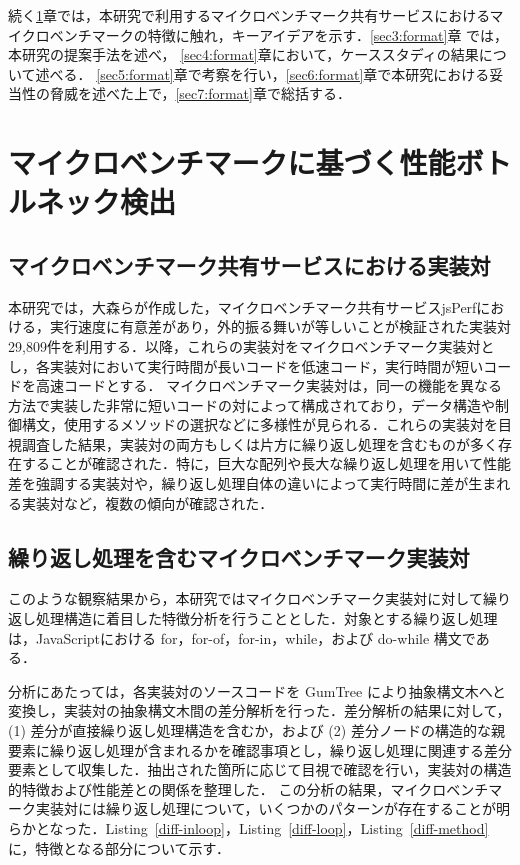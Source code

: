 \documentclass[submit,techrep,noauthor]{ipsj}
\newcommand{\todo}[1]{\colorbox{yellow}{{\bf TODO}:}{\color{red} {\textbf{[#1]}}}}
\begin{document}
続く\ref{sec2:format}章では，本研究で利用するマイクロベンチマーク共有サービスにおけるマイクロベンチマークの特徴に触れ，キーアイデアを示す．\ref{sec3:format}章 では，本研究の提案手法を述べ， \ref{sec4:format}章において，ケーススタディの結果について述べる． \ref{sec5:format}章で考察を行い，\ref{sec6:format}章で本研究における妥当性の脅威を述べた上で，\ref{sec7:format}章で総括する． 


\section{マイクロベンチマークに基づく性能ボトルネック検出}
\label{sec2:format}


\subsection{マイクロベンチマーク共有サービスにおける実装対}

本研究では，大森ら\cite{omori}が作成した，マイクロベンチマーク共有サービスjsPerfにおける，実行速度に有意差があり，外的振る舞いが等しいことが検証された実装対29,809件を利用する．以降，これらの実装対をマイクロベンチマーク実装対とし，各実装対において実行時間が長いコードを低速コード，実行時間が短いコードを高速コードとする．
マイクロベンチマーク実装対は，同一の機能を異なる方法で実装した非常に短いコードの対によって構成されており，データ構造や制御構文，使用するメソッドの選択などに多様性が見られる．これらの実装対を目視調査した結果，実装対の両方もしくは片方に繰り返し処理を含むものが多く存在することが確認された．特に，巨大な配列や長大な繰り返し処理を用いて性能差を強調する実装対や，繰り返し処理自体の違いによって実行時間に差が生まれる実装対など，複数の傾向が確認された．


\subsection{繰り返し処理を含むマイクロベンチマーク実装対}
\label{section2.2}

このような観察結果から，本研究ではマイクロベンチマーク実装対に対して繰り返し処理構造に着目した特徴分析を行うこととした．対象とする繰り返し処理は，JavaScriptにおける for，for-of，for-in，while，および do-while 構文である．


分析にあたっては，各実装対のソースコードを GumTree \cite{gumtree}により抽象構文木へと変換し，実装対の抽象構文木間の差分解析を行った．差分解析の結果に対して，(1) 差分が直接繰り返し処理構造を含むか，および (2) 差分ノードの構造的な親要素に繰り返し処理が含まれるかを確認事項とし，繰り返し処理に関連する差分要素として収集した．抽出された箇所に応じて目視で確認を行い，実装対の構造的特徴および性能差との関係を整理した．
この分析の結果，マイクロベンチマーク実装対には繰り返し処理について，いくつかのパターンが存在することが明らかとなった．Listing~\ref{diff-inloop}，Listing~\ref{diff-loop}，Listing~\ref{diff-method}に，特徴となる部分について示す．
\end{document}
